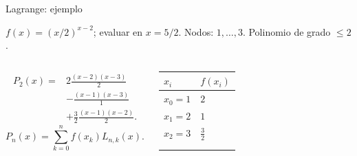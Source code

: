 \documentclass[main.tex]{subfiles}
\begin{document}
\begin{frame}[t]{Lagrange: ejemplo}
\par\noindent\begin{minipage}[t][7.5mm][t]{\textwidth}\small\strut $f(x)=(x/2)^{x-2}$; evaluar en $x=5/2$. Nodos: $1,\ldots,3$. Polinomio de grado $\le 2$.\end{minipage}\par\nointerlineskip
\begin{columns}[T]\small\setlength{\abovedisplayskip}{4pt}\setlength{\belowdisplayskip}{4pt}\small\begin{align*}
P_2(x)={}&2\frac{(x-2)(x-3)}{2}\\
&-\frac{(x-1)(x-3)}{1}\\
&+\frac32\frac{(x-1)(x-2)}{2}.
\end{align*}\[P_n(x)=\sum_{k=0}^n f(x_k)L_{n,k}(x).\]\begingroup\small\setlength{\tabcolsep}{3pt}\begin{center}\begin{tabular}{|C{.42\textwidth}|C{.42\textwidth}|}\hline
\rule[-2mm]{0pt}{6mm}$x_i$&$f(x_i)$\\\hline
\rule[-2.5mm]{0pt}{6mm}$x_0=1$&$2$\\\hline
\rule[-2.5mm]{0pt}{6mm}$x_1=2$&$1$\\\hline
\rule[-2.5mm]{0pt}{6mm}$x_2=3$&$\frac{3}{2}$\\\hline
\rule[-2.5mm]{0pt}{6mm}&\\\hline
\rule[-2.5mm]{0pt}{6mm}&\\\hline
\end{tabular}\end{center}\endgroup\par
\end{columns}
\end{frame}
\end{document}
